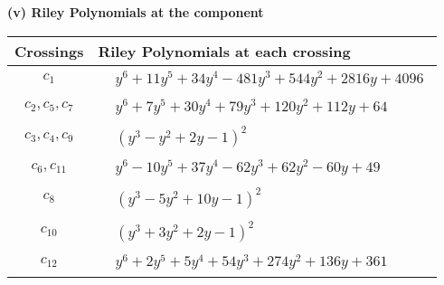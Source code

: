 \documentclass[1p]{elsarticle_modified}
\theoremstyle{definition}
\begin{document}
\newpage\renewcommand{\arraystretch}{1}
\flushleft \textbf{(v) Riley Polynomials at the component}\newline \\
\begin{tabular}{m{50pt}|m{274pt}}
Crossings & \hspace{64pt}Riley Polynomials at each crossing \\
\hline $$\begin{aligned}c_{1}\end{aligned}$$&$\begin{aligned}
&y^6+11 y^5+34 y^4-481 y^3+544 y^2+2816 y+4096
\end{aligned}$\\
\hline $$\begin{aligned}c_{2},c_{5},c_{7}\end{aligned}$$&$\begin{aligned}
&y^6+7 y^5+30 y^4+79 y^3+120 y^2+112 y+64
\end{aligned}$\\
\hline $$\begin{aligned}c_{3},c_{4},c_{9}\end{aligned}$$&$\begin{aligned}
&(y^3- y^2+2 y-1)^2
\end{aligned}$\\
\hline $$\begin{aligned}c_{6},c_{11}\end{aligned}$$&$\begin{aligned}
&y^6-10 y^5+37 y^4-62 y^3+62 y^2-60 y+49
\end{aligned}$\\
\hline $$\begin{aligned}c_{8}\end{aligned}$$&$\begin{aligned}
&(y^3-5 y^2+10 y-1)^2
\end{aligned}$\\
\hline $$\begin{aligned}c_{10}\end{aligned}$$&$\begin{aligned}
&(y^3+3 y^2+2 y-1)^2
\end{aligned}$\\
\hline $$\begin{aligned}c_{12}\end{aligned}$$&$\begin{aligned}
&y^6+2 y^5+5 y^4+54 y^3+274 y^2+136 y+361
\end{aligned}$\\
\hline
\end{tabular}\\~\\
\end{document}

